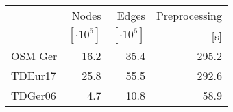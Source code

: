 \begin{tabular}{lrrr}
\toprule
 &          Nodes &          Edges & Preprocessing \\ & $[\cdot 10^6]$ & $[\cdot 10^6]$ &           [s] \\
\midrule
OSM Ger &       16.2 &       35.4 &                         295.2 \\
TDEur17 &       25.8 &       55.5 &                         292.6 \\
TDGer06 &        4.7 &       10.8 &                          58.9 \\
\bottomrule
\end{tabular}

